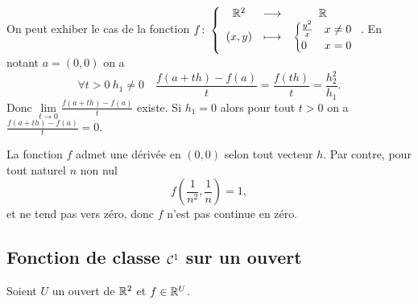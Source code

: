 On peut exhiber le cas de la fonction \(f\colon \left\{\begin{array}{ccc} \mathbb{R}^2 & \longrightarrow &\mathbb{R}\\ (x, y) & \longmapsto & \begin{cases} \frac{y^2}{x} & x\neq 0 \\ 0 & x=0 \end{cases} \end{array} \right.\). En notant \(a=(0, 0)\) on a
\begin{equation}
  \forall t>0 \ h_1\neq 0 \quad \frac{f(a+th)-f(a)}{t} = \frac{f(th)}{t} = \frac{h_2^2}{h_1}.
\end{equation}
Donc \(\lim\limits_{t\to 0} \frac{f(a+th)-f(a)}{t}\) existe. Si \(h_1=0\) alors pour tout \(t>0\) on a \(\frac{f(a+th)-f(a)}{t}=0\).

La fonction \(f\) admet une dérivée en \((0, 0)\) selon tout vecteur \(h\). Par contre, pour tout naturel \(n\) non nul
\begin{equation}
  f\left(\frac{1}{n^2}, \frac{1}{n}\right)=1,
\end{equation}
et ne tend pas vers zéro, donc \(f\) n'est pas continue en zéro.

\subsection{Fonction de classe \(\mathcal{C}^{1}\) sur un ouvert}

Soient \(U\) un ouvert de \(\mathbb{R}^2\) et \(f \in \mathbb{R}^U\).

